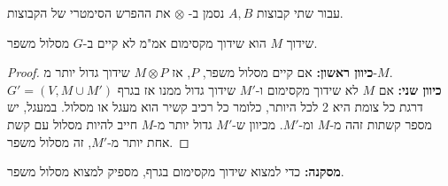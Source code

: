 עבור שתי קבוצות 
$A, B$
נסמן ב-%
$\otimes$
את ההפרש הסימטרי של הקבוצות.

\begin{theorem}
שידוך $M$ הוא שידוך מקסימום אמ"מ לא קיים ב-$G$ מסלול משפר.
\end{theorem}

\begin{proof}
\textbf{כיוון ראשון:}
אם קיים מסלול משפר, $P$, אז 
$M \otimes P$
שידוך גדול יותר מ-$M$.
\\
\textbf{כיוון שני:}
אם $M$ לא שידוך מקסימום ו-$M'$ שידוך גדול ממנו אז בגרף 
$G' = (V, M \cup M')$
דרגת כל צומת היא 2 לכל היותר, כלומר כל רכיב קשיר הוא מעגל או מסלול.
במעגל, יש מספר קשתות זהה מ-$M$ ומ-$M'$.
מכיוון ש-$M'$ גדול יותר מ-$M$ חייב להיות מסלול עם קשת אחת יותר מ-$M'$, זה מסלול משפר.
\end{proof}

\textbf{מסקנה:}
כדי למצוא שידוך מקסימום בגרף, מספיק למצוא מסלול משפר.

